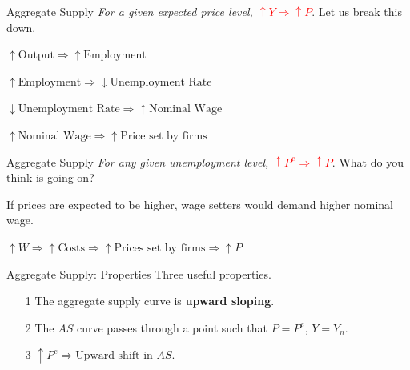 \documentclass[shownotes,11pt, aspectratio=169]{beamer}
\newenvironment{wideitemize}{\itemize\addtolength{\itemsep}{10pt}}{\enditemize}
\begin{document}
\begin{frame}{Aggregate Supply}
\textit{For a given expected price level, \textcolor{red}{$\uparrow Y \Rightarrow \uparrow P$}}. Let us break this down.

\begin{wideitemize}
\item $\uparrow \text{Output} \Rightarrow \uparrow \text{Employment}$ \pause
\item $\uparrow \text{Employment} \Rightarrow \downarrow \text{Unemployment Rate}$ \pause
\item $\downarrow \text{Unemployment Rate} \Rightarrow \uparrow \text{Nominal Wage}$ \pause
\item $\uparrow \text{Nominal Wage} \Rightarrow \uparrow \text{Price set by firms}$
\end{wideitemize}
\end{frame}

\begin{frame}{Aggregate Supply}
\textit{For any given unemployment level, \textcolor{red}{$\uparrow P^e \Rightarrow \uparrow P$}}.
What do you think is going on? \pause

\begin{wideitemize}
\item If prices are expected to be higher, wage setters would demand higher nominal wage.
\item $\uparrow W \Rightarrow \uparrow \text{Costs} \Rightarrow \uparrow\text{Prices set by firms} \Rightarrow \uparrow P$
\end{wideitemize}
\end{frame}

\begin{frame}{Aggregate Supply: Properties}
Three useful properties.

\begin{itemize}
\item[1] The aggregate supply curve is \textbf{upward sloping}.
\item[2] The $AS$ curve passes through a point such that $P=P^e$, $Y=Y_n$.
\item[3] $\uparrow P^e \Rightarrow \text{Upward shift in } AS$.
\end{itemize}
\end{frame}
\end{document}
